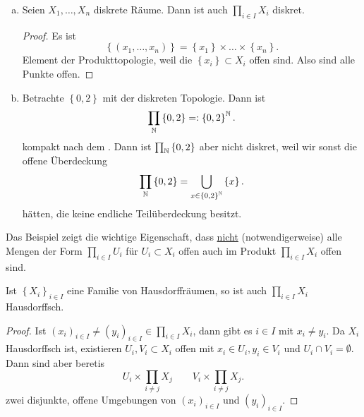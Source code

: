 \begin{example}
    \begin{enumerate}[a)]
        \item Seien $X_1,\ldots,X_n$ diskrete Räume. Dann ist auch $\prod_{i \in I}X_i$ diskret.
            \begin{proof}
                Es ist
                \[
                    \left \{(x_1,\ldots,x_n)\right\}  = \left \{x_1\right\} \times \ldots\times \left \{x_n\right\} 
                .\] 
                Element der Produkttopologie, weil die $\left \{x_i\right\} \subset X_i$ offen sind. Also sind alle Punkte offen.
            \end{proof}
        \item Betrachte $\left \{0,2\right\} $ mit der diskreten Topologie. Dann ist
            \[
            \prod_{\mathbb{N}} \left \{0,2\right\} =: \left \{0,2\right\} ^{\mathbb{N}}
            .\] 
            kompakt nach dem . Dann ist $\prod_{\mathbb{N}} \left \{0,2\right\} $ aber nicht diskret, weil wir sonst die offene Überdeckung
            \[
            \prod_{\mathbb{N}} \left \{0,2\right\} = \bigcup_{x\in \left \{0,2\right\} ^{\mathbb{N}}}  \left \{x\right\} 
            .\] 
            hätten, die keine endliche Teilüberdeckung besitzt.
    \end{enumerate}
\end{example}
\begin{remark*}
    Das Beispiel zeigt die wichtige Eigenschaft, dass \underline{nicht} (notwendigerweise) alle Mengen der Form $\prod_{i \in I}U_i$ für $U_i\subset X_i$ offen auch im Produkt $\prod_{i \in I}X_i$ offen sind.
\end{remark*}

\begin{theorem}\label{thm:produkte-von-Hausdorff-Räumen-sind-Hausdorff}
    Ist $\left \{X_i\right\} _{i \in I}$ eine Familie von Hausdorffräumen, so ist auch  $\prod _{i \in I} X_i$ Hausdorffsch.
\end{theorem}
\begin{proof}
    Ist $(x_i)_{i \in I} \neq  (y_i)_{i \in I} \in  \prod _{i \in I}X_i$, dann gibt es $i\in I$ mit $x_i \neq  y_i$. Da $X_i$ Hausdorffsch ist, existieren  $U_i, V_i \subset X_i$ offen mit $x_i \in U_i, y_i \in V_i$ und $U_i \cap  V_i = \emptyset$. Dann sind aber beretis
    \[
    U_i \times  \prod_{i\neq j} X_j \qquad V_i \times \prod_{i\neq j} X_j
    .\] 
    zwei disjunkte, offene Umgebungen von $(x_i)_{i \in I}$ und $(y_i)_{i \in I}$.
\end{proof}

